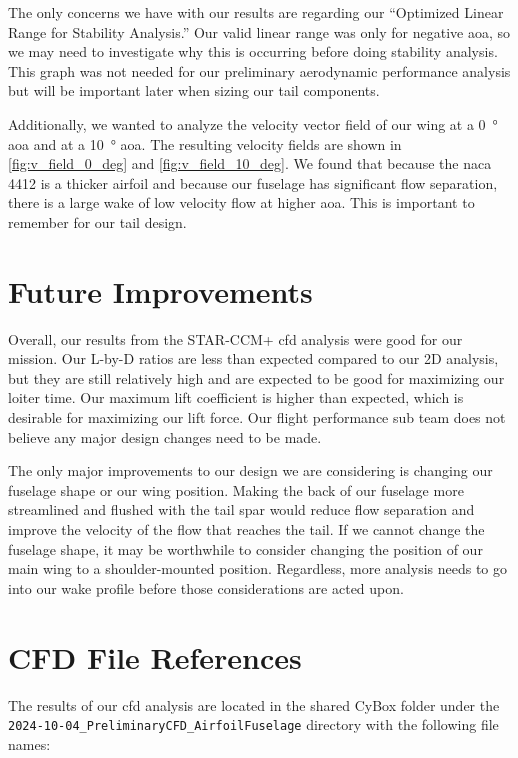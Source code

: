 The only concerns we have with our results are regarding our ``Optimized Linear Range for Stability Analysis.'' Our valid linear range was only for negative \acrshort{aoa}, so we may need to investigate why this is occurring before doing stability analysis. This graph was not needed for our preliminary aerodynamic performance analysis but will be important later when sizing our tail components. 

Additionally, we wanted to analyze the velocity vector field of our wing at a \qty{0}{\degree} \acrshort{aoa} and at a \qty{10}{\degree} \acrshort{aoa}. The resulting velocity fields are shown in \autoref{fig:v_field_0_deg} and \autoref{fig:v_field_10_deg}. We found that because the \acrshort{naca} 4412 is a thicker airfoil and because our fuselage has significant flow separation, there is a large wake of low velocity flow at higher \acrshort{aoa}. This is important to remember for our tail design.

\section{Future Improvements}\label{sec:future_improvements}

Overall, our results from the STAR-CCM+ \acrshort{cfd} analysis were good for our mission. Our \gls{L-by-D} ratios are less than expected compared to our 2D analysis, but they are still relatively high and are expected to be good for maximizing our loiter time. Our maximum lift coefficient is higher than expected, which is desirable for maximizing our lift force. Our flight performance sub team does not believe any major design changes need to be made.

The only major improvements to our design we are considering is changing our fuselage shape or our wing position. Making the back of our fuselage more streamlined and flushed with the tail spar would reduce flow separation and improve the velocity of the flow that reaches the tail. If we cannot change the fuselage shape, it may be worthwhile to consider changing the position of our main wing to a shoulder-mounted position. Regardless, more analysis needs to go into our wake profile before those considerations are acted upon.

\section{CFD File References}\label{sec:file_ref}

The results of our \acrshort{cfd} analysis are located in the shared CyBox folder under the \verb|2024-10-04_PreliminaryCFD_AirfoilFuselage| directory with the following file names:

